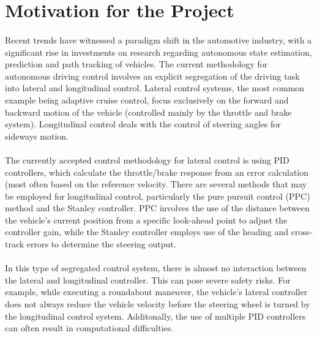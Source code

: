 \section{Motivation for the Project}
\paragraph{}
Recent trends have witnessed a paradigm shift in the automotive industry, with a significant rise in investments on research regarding autonomous state estimation, prediction and path tracking of vehicles. The current methodology for autonomous driving control involves an explicit segregation of the driving task into lateral and longitudinal control. Lateral control systems, the most common example being adaptive cruise control, focus exclusively on the forward and backward motion of the vehicle (controlled mainly by the throttle and brake system). Longitudinal control deals with the control of steering angles for sideways motion.

\paragraph{}
The currently accepted control methodology for lateral control is using PID controllers, which calculate the throttle/brake response from an error calculation (most often based on the reference velocity. There are several methods that may be employed for longitudinal control, particularly the pure pursuit control (PPC) method and the Stanley controller. PPC involves the use of the distance between the vehicle's current position from a specific look-ahead point to adjust the controller gain, while the Stanley controller employs use of the heading and cross-track errors to determine the steering output.

\paragraph{}
In this type of segregated control system, there is almost no interaction between the lateral and longitudinal controller. This can pose severe safety risks. For example, while executing a roundabout maneuver, the vehicle's lateral controller does not always reduce the vehicle velocity before the steering wheel is turned by the longitudinal control system. Additonally, the use of multiple PID controllers can often result in computational difficulties.

